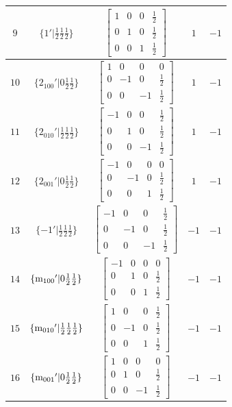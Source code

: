 \documentclass[fleqn,8pt]{jsarticle}
\begin{document}
\begin{longtable}{ccccc}
$ 9 $ & $ \{1{}'|\frac{1}{2} \frac{1}{2} \frac{1}{2}\} $ & $ \begin{bmatrix} 1 & 0 & 0 & \frac{1}{2} \\ 0 & 1 & 0 & \frac{1}{2} \\ 0 & 0 & 1 & \frac{1}{2} \end{bmatrix} $ & $ 1 $ & $ -1 $ \\ \hline
$ 10 $ & $ \{2{}_{100}{}'|0 \frac{1}{2} \frac{1}{2}\} $ & $ \begin{bmatrix} 1 & 0 & 0 & 0 \\ 0 & -1 & 0 & \frac{1}{2} \\ 0 & 0 & -1 & \frac{1}{2} \end{bmatrix} $ & $ 1 $ & $ -1 $ \\ \hline
$ 11 $ & $ \{2{}_{010}{}'|\frac{1}{2} \frac{1}{2} \frac{1}{2}\} $ & $ \begin{bmatrix} -1 & 0 & 0 & \frac{1}{2} \\ 0 & 1 & 0 & \frac{1}{2} \\ 0 & 0 & -1 & \frac{1}{2} \end{bmatrix} $ & $ 1 $ & $ -1 $ \\ \hline
$ 12 $ & $ \{2{}_{001}{}'|0 \frac{1}{2} \frac{1}{2}\} $ & $ \begin{bmatrix} -1 & 0 & 0 & 0 \\ 0 & -1 & 0 & \frac{1}{2} \\ 0 & 0 & 1 & \frac{1}{2} \end{bmatrix} $ & $ 1 $ & $ -1 $ \\ \hline
$ 13 $ & $ \{-1{}'|\frac{1}{2} \frac{1}{2} \frac{1}{2}\} $ & $ \begin{bmatrix} -1 & 0 & 0 & \frac{1}{2} \\ 0 & -1 & 0 & \frac{1}{2} \\ 0 & 0 & -1 & \frac{1}{2} \end{bmatrix} $ & $ -1 $ & $ -1 $ \\ \hline
$ 14 $ & $ \{{\rm m}_{100}{}'|0 \frac{1}{2} \frac{1}{2}\} $ & $ \begin{bmatrix} -1 & 0 & 0 & 0 \\ 0 & 1 & 0 & \frac{1}{2} \\ 0 & 0 & 1 & \frac{1}{2} \end{bmatrix} $ & $ -1 $ & $ -1 $ \\ \hline
$ 15 $ & $ \{{\rm m}_{010}{}'|\frac{1}{2} \frac{1}{2} \frac{1}{2}\} $ & $ \begin{bmatrix} 1 & 0 & 0 & \frac{1}{2} \\ 0 & -1 & 0 & \frac{1}{2} \\ 0 & 0 & 1 & \frac{1}{2} \end{bmatrix} $ & $ -1 $ & $ -1 $ \\ \hline
$ 16 $ & $ \{{\rm m}_{001}{}'|0 \frac{1}{2} \frac{1}{2}\} $ & $ \begin{bmatrix} 1 & 0 & 0 & 0 \\ 0 & 1 & 0 & \frac{1}{2} \\ 0 & 0 & -1 & \frac{1}{2} \end{bmatrix} $ & $ -1 $ & $ -1 $ \\
\end{longtable}
\end{document}
